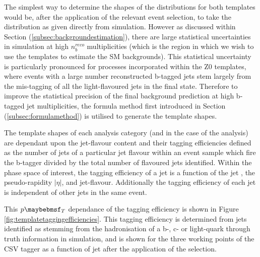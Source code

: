 The simplest way to determine the shapes of the \nbreco distributions for both templates would be, after the application of the relevant event selection, to take the \nbreco distribution as given directly from simulation. However as discussed within Section (\ref{subsec:backgroundestimation}), there are large statistical uncertainties in simulation at high $n_{b}^{reco}$ multiplicities (which is the region in which we wish to use the templates to estimate the \ac{SM} backgrounds). This statistical uncertainty is particularly pronounced for processes incorporated within the Z0 templates, where events with a large number reconstructed b-tagged jets stem largely from the mis-tagging of all the light-flavoured jets in the final state. Therefore to improve the statistical precision of the final background prediction at high b-tagged jet multiplicities, the formula method first introduced in Section (\ref{subsec:formulamethod}) is utilised to generate the template shapes. 

The template shapes of each analysis category (\theht and \njet in the case of the \alphat analysis) are dependant upon the jet-flavour content and their tagging efficiencies defined as the number of jets of a particular jet flavour within an event sample which fire the b-tagger divided by the total number of flavoured jets identified. Within the phase space of interest, the tagging efficiency of a jet is a function of the jet \pt, the pseudo-rapidity $\rvert\eta\lvert$, and jet-flavour. Additionally the tagging efficiency of each jet is independent of other jets in the same event.

This $\pt$ dependance of the tagging efficiency is shown in Figure \ref{fig:templatetaggingefficiencies}. This tagging efficiency is determined from jets identified as stemming from the hadronisation of a b-, c- or light-quark through truth information in simulation, and is shown for the three working points of the \ac{CSV} tagger as a function of jet \pt after the application of the \alphat \mupjets selection. 

